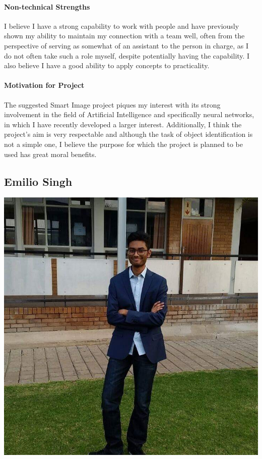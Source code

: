 \documentclass[12pt]{article}
\begin{document}
\paragraph{Non-technical Strengths}
I believe I have a strong capability to work with people and have previously shown my ability to maintain my connection with a team well, often from the perspective of serving as somewhat of an assistant to the person in charge, as I do not often take such a role myself, despite potentially having the capability. 
\newline I also believe I have a good ability to apply concepts to practicality.
\paragraph{Motivation for Project}
The suggested Smart Image project piques my interest with its strong involvement in the field of Artificial Intelligence and specifically neural networks, in which I have recently developed a larger interest. Additionally, I think the project's aim is very respectable and although the task of object identification is not a simple one, I believe the purpose for which the project is planned to be used has great moral benefits.

\subsection{Emilio Singh}
\includegraphics[scale=0.2]{Emilio}
\end{document}
